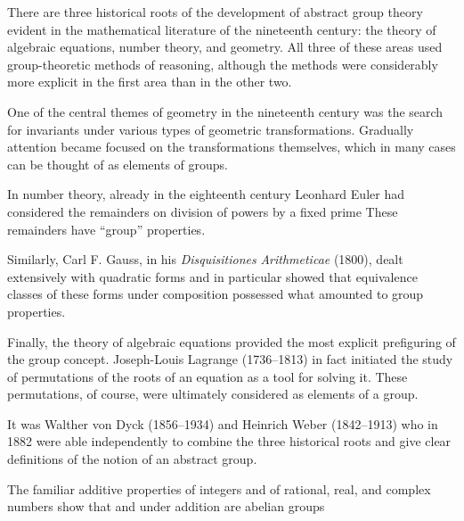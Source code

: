 \documentclass[11pt,oneside]{article}
\begin{document}
\BookNarrativefalse

\begin{BookBody}


\noindent There are three historical roots of the development of abstract group theory evident in the mathematical literature of the nineteenth century: the theory of algebraic equations, number theory, and geometry. All three of these areas used group-theoretic methods of reasoning, although the methods were considerably more explicit in the first area than in the other two.

\noindent One of the central themes of geometry in the nineteenth century was the search for invariants under various types of geometric transformations. Gradually attention became focused on the transformations themselves, which in many cases can be thought of as elements of groups.

\noindent In number theory, already in the eighteenth century Leonhard Euler had considered the remainders on division of powers  by a fixed prime  These remainders have “group” properties.

Similarly, Carl F. Gauss, in his\textit{ Disquisitiones} \textit{Arithmeticae} (1800), dealt extensively with quadratic forms  and in particular showed that equivalence classes of these forms under composition possessed what amounted to group properties.

Finally, the theory of algebraic equations provided the most explicit prefiguring of the group concept. Joseph-Louis Lagrange (1736–1813) in fact initiated the study of permutations of the roots of an equation as a tool for solving it. These permutations, of course, were ultimately considered as elements of a group.

It was Walther von Dyck (1856–1934) and Heinrich Weber (1842–1913) who in 1882 were able independently to combine the three historical roots and give clear definitions of the notion of an abstract group.

 The familiar additive properties of integers and of rational, real, and complex numbers show that  and  under addition are abelian groups\BookEnd{\blacktriangle}


\end{BookBody}
\end{document}
